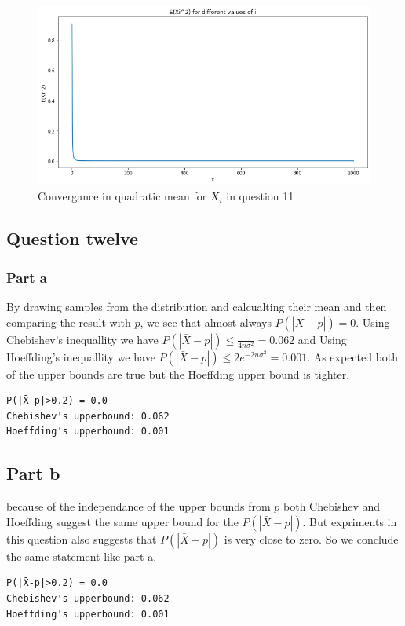 \documentclass[12pt, a4paper]{book}
\begin{document}
\begin{figure}[h]
    \centering
    \includegraphics[width=0.5\linewidth]{images/question11/convergance_dist_prob.png}
    \caption{Convergance in quadratic mean for $X_i$ in question 11}
    \label{convergance_dist_prob}
\end{figure}

\subsection*{Question twelve}

\subsubsection*{Part a}

By drawing samples from the distribution and calcualting their mean and then
comparing the result with $p$, we see that almost always $P(|\bar{X} - p|) = 0$.
Using Chebishev's inequallity we have $P(|\bar{X} - p|) \le \frac{1}{4n\sigma^2} = 0.062$ and
Using Hoeffding's inequallity we have $P(|\bar{X} - p|) \le 2e^{-2n\sigma^2} = 0.001$. As expected
both of the upper bounds are true but the Hoeffding upper bound is tighter.

\begin{mdframed}
\begin{verbatim}
P(|X̄-p|>0.2) = 0.0
Chebishev's upperbound: 0.062
Hoeffding's upperbound: 0.001
\end{verbatim}
\end{mdframed}

\subsection*{Part b}

because of the independance of the upper bounds from $p$ both Chebishev and Hoeffding
suggest the same upper bound for the $P(|\bar{X}-p|)$. But expriments in this question also
suggests that $P(|\bar{X}-p|)$ is very close to zero. So we conclude the same statement like part a.

\begin{mdframed}
\begin{verbatim}
P(|X̄-p|>0.2) = 0.0
Chebishev's upperbound: 0.062
Hoeffding's upperbound: 0.001
\end{verbatim}
\end{mdframed}
\end{document}
